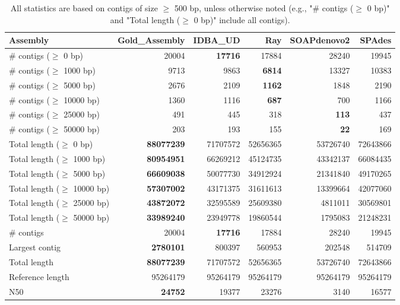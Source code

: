 \documentclass[12pt,a4paper]{article}
\begin{document}
\begin{table}[ht]
\begin{center}
\caption{All statistics are based on contigs of size $\geq$ 500 bp, unless otherwise noted (e.g., "\# contigs ($\geq$ 0 bp)" and "Total length ($\geq$ 0 bp)" include all contigs).}
\begin{tabular}{|l*{5}{|r}|}
\hline
Assembly & Gold\_Assembly & IDBA\_UD & Ray & SOAPdenovo2 & SPAdes \\ \hline
\# contigs ($\geq$ 0 bp) & 20004 & {\bf 17716} & 17884 & 28240 & 19945 \\ \hline
\# contigs ($\geq$ 1000 bp) & 9713 & 9863 & {\bf 6814} & 13327 & 10383 \\ \hline
\# contigs ($\geq$ 5000 bp) & 2676 & 2109 & {\bf 1162} & 1848 & 2190 \\ \hline
\# contigs ($\geq$ 10000 bp) & 1360 & 1116 & {\bf 687} & 700 & 1166 \\ \hline
\# contigs ($\geq$ 25000 bp) & 491 & 445 & 318 & {\bf 113} & 437 \\ \hline
\# contigs ($\geq$ 50000 bp) & 203 & 193 & 155 & {\bf 22} & 169 \\ \hline
Total length ($\geq$ 0 bp) & {\bf 88077239} & 71707572 & 52656365 & 53726740 & 72643866 \\ \hline
Total length ($\geq$ 1000 bp) & {\bf 80954951} & 66269212 & 45124735 & 43342137 & 66084435 \\ \hline
Total length ($\geq$ 5000 bp) & {\bf 66609038} & 50077730 & 34912924 & 21341840 & 49170265 \\ \hline
Total length ($\geq$ 10000 bp) & {\bf 57307002} & 43171375 & 31611613 & 13399664 & 42077060 \\ \hline
Total length ($\geq$ 25000 bp) & {\bf 43872072} & 32595589 & 25609380 & 4811011 & 30569801 \\ \hline
Total length ($\geq$ 50000 bp) & {\bf 33989240} & 23949778 & 19860544 & 1795083 & 21248231 \\ \hline
\# contigs & 20004 & {\bf 17716} & 17884 & 28240 & 19945 \\ \hline
Largest contig & {\bf 2780101} & 800397 & 560953 & 202548 & 514709 \\ \hline
Total length & {\bf 88077239} & 71707572 & 52656365 & 53726740 & 72643866 \\ \hline
Reference length & 95264179 & 95264179 & 95264179 & 95264179 & 95264179 \\ \hline
N50 & {\bf 24752} & 19377 & 23276 & 3140 & 16577 \\ \hline

\end{tabular}
\end{center}
\end{table}
\end{document}
